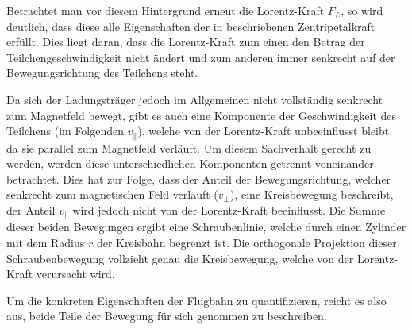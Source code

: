 Betrachtet man vor diesem Hintergrund erneut die Lorentz-Kraft \(F_L\), so wird deutlich, dass diese alle Eigenschaften der in
 beschriebenen Zentripetalkraft erf\"ullt. Dies liegt daran, dass die Lorentz-Kraft zum einen den Betrag
der Teilchengeschwindigkeit nicht \"andert und zum anderen immer senkrecht auf der Bewegungsrichtung des Teilchens steht.

Da sich der Ladungstr\"ager jedoch im Allgemeinen nicht vollst\"andig senkrecht zum Magnetfeld bewegt, gibt es auch eine Komponente
der Geschwindigkeit des Teilchens (im Folgenden \(v_\parallel\)), welche von der Lorentz-Kraft unbeeinflusst bleibt, da sie parallel zum
Magnetfeld verl\"auft.
Um diesem Sachverhalt gerecht zu werden, werden diese unterschiedlichen Komponenten getrennt voneinander betrachtet. Dies hat zur
Folge, dass der Anteil der Bewegungsrichtung, welcher senkrecht zum magnetischen Feld verl\"auft (\(v_\perp\)), eine Kreisbewegung
beschreibt,
der Anteil \(v_\parallel\) wird jedoch nicht von der Lorentz-Kraft beeinflusst. 
Die Summe dieser beiden Bewegungen ergibt
eine Schraubenlinie, welche durch einen Zylinder mit dem Radius \(r\) der Kreisbahn begrenzt ist. Die orthogonale Projektion dieser
Schraubenbewegung vollzieht genau die Kreisbewegung, welche von der Lorentz-Kraft verursacht wird.

Um die konkreten Eigenschaften der Flugbahn zu quantifizieren, reicht es also aus, beide Teile der Bewegung f\"ur sich genommen
zu beschreiben. 
